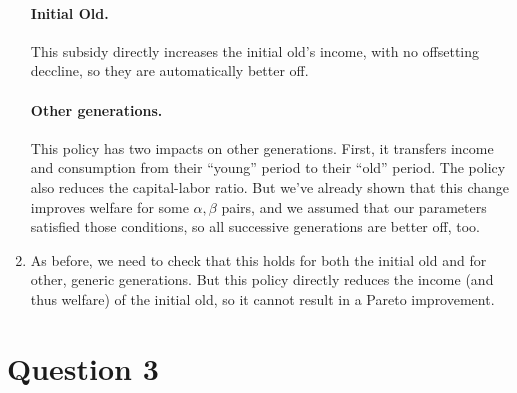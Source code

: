 \documentclass[11pt]{article}
\begin{document}
\begin{enumerate}[label=\alph*)]
\paragraph{Initial Old.} This subsidy directly increases the initial old's income, with no offsetting deccline, so they are automatically better off.

\paragraph{Other generations.} This policy has two impacts on other generations. First, it transfers income and consumption from their ``young'' period to their ``old'' period. The policy also reduces the capital-labor ratio. But we've already shown that this change improves welfare for some $\alpha, \beta$ pairs, and we assumed that our parameters satisfied those conditions, so all successive generations are better off, too.

\item As before, we need to check that this holds for both the initial old and for other, generic generations. But this policy directly reduces the income (and thus welfare) of the initial old, so it cannot result in a Pareto improvement.
\end{enumerate}

\newpage
\section{Question 3}
\label{sec:orgcda8243}
\end{document}
